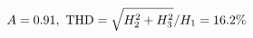 \documentclass[preview]{standalone}
\begin{document}
\begin{align*}
\special{dvisvgm:raw <g id='unique000'>}A=0.91,\ \text{THD}=\sqrt{H_2^2+H_3^2}/H_1=16.2\%\special{dvisvgm:raw </g>}
\end{align*}
\end{document}

